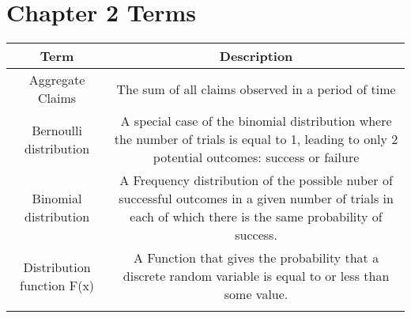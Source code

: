 \documentclass[]{book}
\theoremstyle{definition}
\theoremstyle{definition}
\theoremstyle{definition}
\theoremstyle{remark}
\begin{document}
\section{Chapter 2 Terms}\label{chapter-2-terms}

\begin{longtable}[]{@{}cc@{}}
\toprule
\begin{minipage}[b]{0.43\columnwidth}\centering\strut
Term\strut
\end{minipage} & \begin{minipage}[b]{0.43\columnwidth}\centering\strut
Description\strut
\end{minipage}\tabularnewline
\midrule
\endhead
\begin{minipage}[t]{0.43\columnwidth}\centering\strut
Aggregate Claims\strut
\end{minipage} & \begin{minipage}[t]{0.43\columnwidth}\centering\strut
The sum of all claims observed in a period of time\strut
\end{minipage}\tabularnewline
\begin{minipage}[t]{0.43\columnwidth}\centering\strut
Bernoulli distribution\strut
\end{minipage} & \begin{minipage}[t]{0.43\columnwidth}\centering\strut
A special case of the binomial distribution where the number of trials
is equal to 1, leading to only 2 potential outcomes: success or
failure\strut
\end{minipage}\tabularnewline
\begin{minipage}[t]{0.43\columnwidth}\centering\strut
Binomial distribution\strut
\end{minipage} & \begin{minipage}[t]{0.43\columnwidth}\centering\strut
A Frequency distribution of the possible nuber of successful outcomes in
a given number of trials in each of which there is the same probability
of success.\strut
\end{minipage}\tabularnewline
\begin{minipage}[t]{0.43\columnwidth}\centering\strut
Distribution function F(x)\strut
\end{minipage} & \begin{minipage}[t]{0.43\columnwidth}\centering\strut
A Function that gives the probability that a discrete random variable is
equal to or less than some value.\strut
\end{minipage}\tabularnewline
\begin{minipage}[t]{0.43\columnwidth}\centering\strut

\end{minipage}
\end{longtable}
\end{document}
